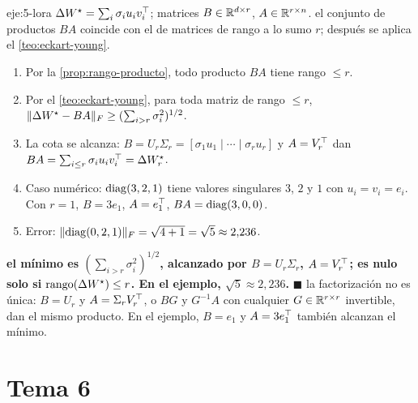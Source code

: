 \begin{solucion}{eje:5-lora}
\datos $\Delta W^{\star}=\sum_i\sigma_iu_iv_i^{\top}$; matrices $B\in\mathbb{R}^{d\times r}$, $A\in\mathbb{R}^{r\times n}$.
\planteamiento el conjunto de productos $BA$ coincide con el de matrices de rango a lo sumo $r$; después se aplica el \cref{teo:eckart-young}.
\pasos
\begin{enumerate}[label=\arabic*.]
  \item Por la \cref{prop:rango-producto}, todo producto $BA$ tiene rango $\le r$.
  \item Por el \cref{teo:eckart-young}, para toda matriz de rango $\le r$, $\lVert\Delta W^{\star}-BA\rVert_F\ge(\sum_{i>r}\sigma_i^{2})^{1/2}$.
  \item La cota se alcanza: $B=U_r\Sigma_r=[\sigma_1u_1\mid\cdots\mid\sigma_ru_r]$ y $A=V_r^{\top}$ dan $BA=\sum_{i\le r}\sigma_iu_iv_i^{\top}=\Delta W^{\star}_r$.
  \item Caso numérico: $\operatorname{diag}(3,2,1)$ tiene valores singulares $3$, $2$ y $1$ con $u_i=v_i=e_i$. Con $r=1$, $B=3e_1$, $A=e_1^{\top}$, $BA=\operatorname{diag}(3,0,0)$.
  \item Error: $\lVert\operatorname{diag}(0,2,1)\rVert_F=\sqrt{4+1}=\sqrt{5}\approx 2{,}236$.
\end{enumerate}
\resultado \textbf{el mínimo es $(\sum_{i>r}\sigma_i^{2})^{1/2}$, alcanzado por $B=U_r\Sigma_r$, $A=V_r^{\top}$; es nulo solo si $\operatorname{rango}(\Delta W^{\star})\le r$. En el ejemplo, $\sqrt{5}\approx 2{,}236$.} \hfill$\blacksquare$
\comprobacion la factorización no es única: $B=U_r$ y $A=\Sigma_rV_r^{\top}$, o $BG$ y $G^{-1}A$ con cualquier $G\in\mathbb{R}^{r\times r}$ invertible, dan el mismo producto. En el ejemplo, $B=e_1$ y $A=3e_1^{\top}$ también alcanzan el mínimo.
\end{solucion}

\section{Tema 6}

